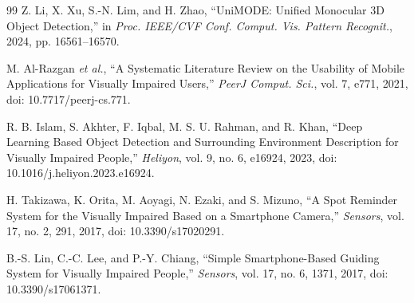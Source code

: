 \documentclass[conference]{IEEEtran}
\begin{document}
\begin{thebibliography}{99}
Z. Li, X. Xu, S.-N. Lim, and H. Zhao, ``UniMODE: Unified Monocular 3D Object Detection,'' in \textit{Proc. IEEE/CVF Conf. Comput. Vis. Pattern Recognit.}, 2024, pp. 16561--16570.

M. Al-Razgan \textit{et al.}, ``A Systematic Literature Review on the Usability of Mobile Applications for Visually Impaired Users,'' \textit{PeerJ Comput. Sci.}, vol. 7, e771, 2021, doi: 10.7717/peerj-cs.771.

R. B. Islam, S. Akhter, F. Iqbal, M. S. U. Rahman, and R. Khan, ``Deep Learning Based Object Detection and Surrounding Environment Description for Visually Impaired People,'' \textit{Heliyon}, vol. 9, no. 6, e16924, 2023, doi: 10.1016/j.heliyon.2023.e16924.

H. Takizawa, K. Orita, M. Aoyagi, N. Ezaki, and S. Mizuno, ``A Spot Reminder System for the Visually Impaired Based on a Smartphone Camera,'' \textit{Sensors}, vol. 17, no. 2, 291, 2017, doi: 10.3390/s17020291.

B.-S. Lin, C.-C. Lee, and P.-Y. Chiang, ``Simple Smartphone-Based Guiding System for Visually Impaired People,'' \textit{Sensors}, vol. 17, no. 6, 1371, 2017, doi: 10.3390/s17061371.

\end{thebibliography}
\end{document}
